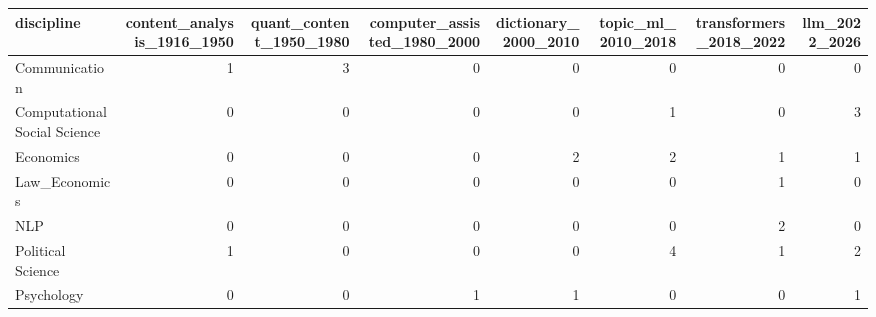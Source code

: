 \begin{tabular}{lrrrrrrr}
\toprule
discipline & content\_analysis\_1916\_1950 & quant\_content\_1950\_1980 & computer\_assisted\_1980\_2000 & dictionary\_2000\_2010 & topic\_ml\_2010\_2018 & transformers\_2018\_2022 & llm\_2022\_2026 \\
\midrule
Communication & 1 & 3 & 0 & 0 & 0 & 0 & 0 \\
Computational Social Science & 0 & 0 & 0 & 0 & 1 & 0 & 3 \\
Economics & 0 & 0 & 0 & 2 & 2 & 1 & 1 \\
Law\_Economics & 0 & 0 & 0 & 0 & 0 & 1 & 0 \\
NLP & 0 & 0 & 0 & 0 & 0 & 2 & 0 \\
Political Science & 1 & 0 & 0 & 0 & 4 & 1 & 2 \\
Psychology & 0 & 0 & 1 & 1 & 0 & 0 & 1 \\
\bottomrule
\end{tabular}
